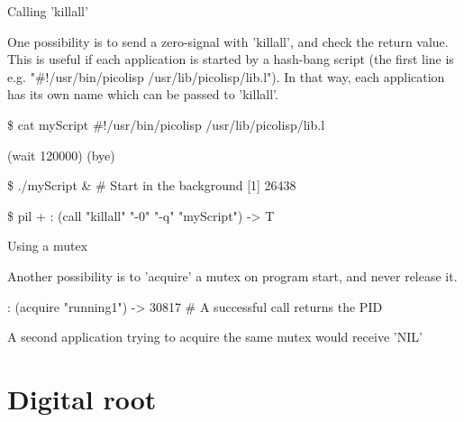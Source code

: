 \begin{wideverbatim}

Calling 'killall'

One possibility is to send a zero-signal with 'killall', and check the return
value. This is useful if each application is started by a hash-bang script (the
first line is e.g. "#!/usr/bin/picolisp /usr/lib/picolisp/lib.l"). In that way,
each application has its own name which can be passed to 'killall'.

\$ cat myScript
#!/usr/bin/picolisp /usr/lib/picolisp/lib.l

(wait 120000)
(bye)

\$ ./myScript \&  # Start in the background
[1] 26438

\$ pil +
: (call "killall" "-0" "-q" "myScript")
-> T

Using a mutex

Another possibility is to 'acquire' a mutex on program start, and never release
it.

: (acquire "running1")
-> 30817  # A successful call returns the PID

A second application trying to acquire the same mutex would receive 'NIL'

\end{wideverbatim}









\pagebreak{}
\section*{Digital root}

